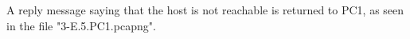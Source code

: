 A reply message saying that the host is not reachable is returned to PC1, as seen in the file "3-E.5.PC1.pcapng".